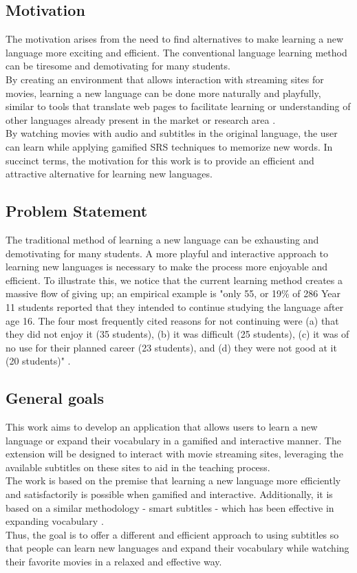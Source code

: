 \documentclass[12pt]{article}
\begin{document}
\subsection{Motivation}
The motivation arises from the need to find alternatives to make learning a new language more exciting and efficient. The conventional language learning method can be tiresome and demotivating for many students. \\
By creating an environment that allows interaction with streaming sites for movies, learning a new language can be done more naturally and playfully, similar to tools that translate web pages to facilitate learning or understanding of other languages already present in the market or research area \cite{ElBatanony21}. \\
By watching movies with audio and subtitles in the original language, the user can learn while applying gamified SRS techniques to memorize new words. In succinct terms, the motivation for this work is to provide an efficient and attractive alternative for learning new languages.

\subsection{Problem Statement}
The traditional method of learning a new language can be exhausting and demotivating for many students. A more playful and interactive approach to learning new languages is necessary to make the process more enjoyable and efficient. 
To illustrate this, we notice that the current learning method creates a massive flow of giving up; an empirical example is "only 55, or 19\% of 286 Year 11 students reported that they intended to continue studying the language after age 16. The four most frequently cited reasons for not continuing were (a) that they did not enjoy it (35 students), (b) it was difficult (25 students), (c) it was of no use for their planned career (23 students), and (d) they were not good at it (20 students)" \cite{Graham1}. 

\subsection{General goals}

This work aims to develop an application that allows users to learn a new language or expand their vocabulary in a gamified and interactive manner. The extension will be designed to interact with movie streaming sites, leveraging the available subtitles on these sites to aid in the teaching process. \\
The work is based on the premise that learning a new language more efficiently and satisfactorily is possible when gamified and interactive. Additionally, it is based on a similar methodology - smart subtitles - which has been effective in expanding vocabulary \cite{Kovacs14}. \\
Thus, the goal is to offer a different and efficient approach to using subtitles so that people can learn new languages and expand their vocabulary while watching their favorite movies in a relaxed and effective way.
\end{document}
